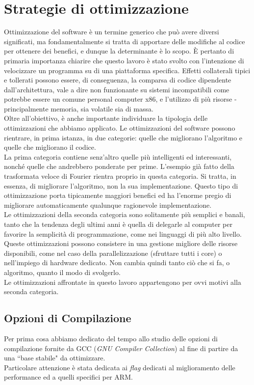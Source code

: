 \section{Strategie di ottimizzazione}
Ottimizzazione del software è un termine generico che può avere diversi 
significati, ma fondamentalmente si tratta di apportare delle modifiche al 
codice per ottenere dei benefici, e dunque la determinante è lo scopo. \`E 
pertanto di 
primaria importanza chiarire che 
questo lavoro è stato svolto con l'intenzione di velocizzare un programma su 
di una piattaforma specifica. Effetti collaterali tipici e tollerati possono 
essere, di conseguenza, la comparsa di codice dipendente dall'architettura, 
vale a dire non funzionante su sistemi incompatibili come potrebbe essere un 
comune 
personal computer x86, e l'utilizzo di più risorse - principalmente memoria, 
sia volatile sia di massa. \\
Oltre all'obiettivo, è anche importante individuare la tipologia delle 
ottimizzazioni 
che abbiamo applicato. Le ottimizzazioni del software possono 
rientrare, in prima istanza, in due 
categorie: quelle che migliorano l'algoritmo e quelle che migliorano il codice. 
\\La prima categoria contiene senz'altro quelle più intelligenti ed 
interessanti, nonché quelle che andrebbero ponderate per prime. L'esempio già 
fatto della trasformata veloce di Fourier rientra proprio in questa categoria. 
Si tratta, in essenza, di migliorare l'algoritmo, non la sua implementazione.
Questo tipo di ottimizzazione porta tipicamente maggiori benefici ed ha 
l'enorme pregio di migliorare automaticamente qualunque ragionevole 
implementazione.\\
Le ottimizzazioni della seconda categoria sono solitamente più semplici e 
banali, tanto che la tendenza degli ultimi anni è quella di delegarle al 
computer per favorire la semplicità di programmazione, come nei linguaggi di 
più alto livello. Queste ottimizzazioni possono consistere in una gestione 
migliore delle risorse disponibili, come nel caso della parallelizzazione 
(sfruttare tutti i core) o nell'impiego di hardware dedicato.
Non cambia quindi tanto ciò che si fa, o algoritmo, quanto il modo di 
svolgerlo.\\
Le ottimizzazioni affrontate in questo lavoro appartengono per ovvi motivi alla 
seconda categoria.
\subsection{Opzioni di Compilazione}
Per prima cosa abbiamo dedicato del tempo allo studio delle opzioni di 
compilazione fornite da GCC (\emph{GNU Compiler Collection}) al fine di partire 
da una ``base stabile" da ottimizzare.\\
Particolare attenzione è stata dedicata ai \emph{flag} dedicati al 
miglioramento delle performance ed a quelli specifici per ARM.\\

